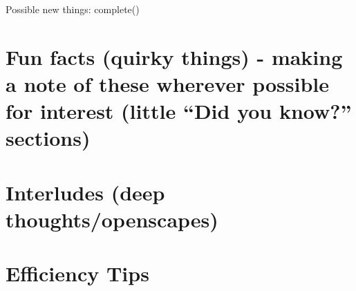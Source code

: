 \documentclass[]{book}
\begin{document}
Possible new things:
complete()

\hypertarget{fun-facts-quirky-things---making-a-note-of-these-wherever-possible-for-interest-little-did-you-know-sections-3}{%
\section{Fun facts (quirky things) - making a note of these wherever possible for interest (little ``Did you know?'' sections)}\label{fun-facts-quirky-things---making-a-note-of-these-wherever-possible-for-interest-little-did-you-know-sections-3}}

\hypertarget{interludes-deep-thoughtsopenscapes-6}{%
\section{Interludes (deep thoughts/openscapes)}\label{interludes-deep-thoughtsopenscapes-6}}

\hypertarget{efficiency-tips-7}{%
\section{Efficiency Tips}\label{efficiency-tips-7}}


\end{document}
